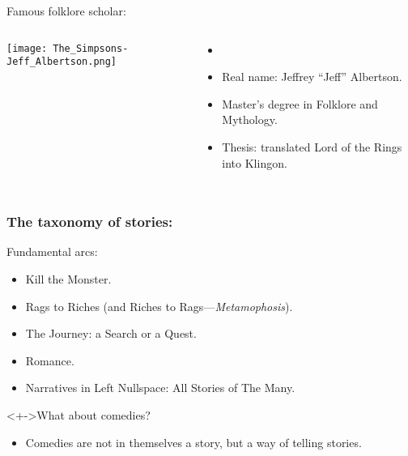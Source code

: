 
\begin{frame}

  \begin{block}{Famous folklore scholar:}
    \begin{columns}
      \texttt{[image: The\_Simpsons-Jeff\_Albertson.png]}
      \begin{itemize}
      \item<+->
      \item<+->
        Real name: Jeffrey ``Jeff'' Albertson.
      \item<+->
        Master's degree in Folklore and Mythology.
      \item<+->
        Thesis: translated Lord of the Rings into Klingon.
      \end{itemize}
    \end{columns}
  \end{block}
\end{frame}

\begin{frame}

  \frametitle{The taxonomy of stories:}

  \begin{block}{Fundamental arcs:}
    \begin{itemize}
    \item<+->
      Kill the Monster.
    \item<+->
      Rags to Riches (and Riches to Rags---\textit{Metamophosis}).
    \item<+->
      The Journey: a Search or a Quest.
    \item<+->
      Romance.
    \item<+->
      Narratives in Left Nullspace: All Stories of The Many.
    \end{itemize}
  \end{block}

  \begin{block}<+->{What about comedies?}
    \begin{itemize}
    \item<+-> 
      Comedies are not in themselves a story, but a way
      of telling stories.
    \end{itemize}
  \end{block}
  
\end{frame}

